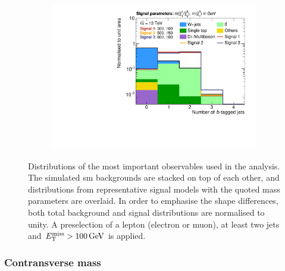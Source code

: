 \begin{figure}
\begin{subfigure}[b]{0.49\linewidth}
		\centering\includegraphics[width=\textwidth]{presel/nBJet}
		\caption{\label{fig:norm_nbjet}}
	\end{subfigure}
	\caption{Distributions of the most important observables used in the analysis. The simulated \gls{sm} backgrounds are stacked on top of each other, and distributions from representative signal models with the quoted mass parameters are overlaid. In order to emphasise the shape differences, both total background and signal distributions are normalised to unity. A preselection of a lepton (electron or muon), at least two jets and $\etmiss > \SI{100}{\GeV}$ is applied.}\label{fig:norm_obs}
\end{figure}

\subsubsection{Contransverse mass}

